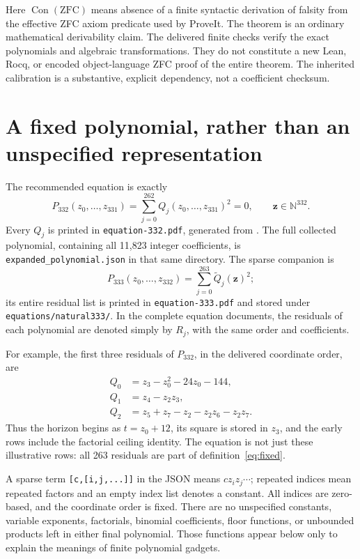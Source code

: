 \documentclass[11pt,letterpaper]{article}
\theoremstyle{remark}\newtheorem{remark}[theorem]{Remark}
\newcommand{\N}{\mathbb N}\newcommand{\Z}{\mathbb Z}
\newcommand{\Con}{\operatorname{Con}}\newcommand{\ZFC}{\mathrm{ZFC}}
\newcommand{\Psmall}{P_{332}}\newcommand{\Psparse}{P_{333}}
\begin{document}
Here \(\Con(\ZFC)\) means absence of a finite syntactic derivation of
falsity from the effective ZFC axiom predicate used by ProveIt. The theorem
is an ordinary mathematical derivability claim. The delivered finite
checks verify the exact polynomials and algebraic transformations. They
do not constitute a new Lean, Rocq, or encoded object-language ZFC proof
of the entire theorem. The inherited calibration is a substantive,
explicit dependency, not a coefficient checksum.

\section{A fixed polynomial, rather than an unspecified representation}
\label{sec:literal}

The recommended equation is exactly
\begin{equation}
 \boxed{\quad\Psmall(z_0,\ldots,z_{331})
       =\sum_{j=0}^{262}Q_j(z_0,\ldots,z_{331})^2=0,
       \qquad\boldsymbol z\in\N^{332}.\quad}
 \label{eq:fixed}
\end{equation}
Every \(Q_j\) is printed in \texttt{equation-332.pdf}, generated from
. The full collected
polynomial, containing all 11,823 integer coefficients, is
\texttt{expanded\_polynomial.json} in that same directory. The sparse
companion is
\[
 \Psparse(z_0,\ldots,z_{332})=\sum_{j=0}^{263}\widetilde Q_j(
 \boldsymbol z)^2;
\]
its entire residual list is printed in \texttt{equation-333.pdf} and
stored under \texttt{equations/natural333/}.
In the complete equation documents, the residuals of each polynomial
are denoted simply by \(R_j\), with the same order and coefficients.

For example, the first three residuals of \(\Psmall\), in the delivered
coordinate order, are
\begin{align*}
 Q_0&=z_3-z_0^2-24z_0-144,\\
 Q_1&=z_4-z_2z_3,\\
 Q_2&=z_5+z_7-z_2-z_2z_6-z_2z_7.
\end{align*}
Thus the horizon begins as \(t=z_0+12\), its square is stored in
\(z_3\), and the early rows include the factorial ceiling identity.
The equation is not just these illustrative rows: all 263 residuals
are part of definition~\eqref{eq:fixed}.

A sparse term \texttt{[c,[i,j,...]]} in the JSON means
\(c z_i z_j\cdots\); repeated indices mean repeated factors and an
empty index list denotes a constant. All indices are zero-based, and
the coordinate order is fixed. There are no unspecified constants,
variable exponents, factorials, binomial coefficients, floor functions,
or unbounded products left in either final polynomial. Those functions
appear below only to explain the meanings of finite polynomial gadgets.
\end{document}
